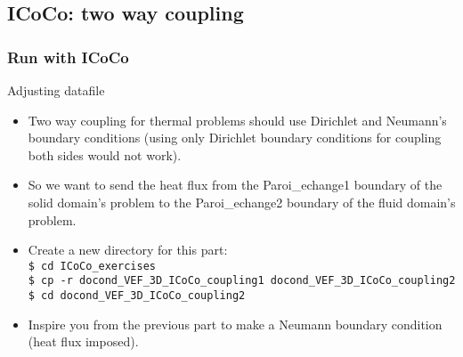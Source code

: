\documentclass[10pt, hyperref={unicode=true,pdfusetitle, bookmarks=true,bookmarksnumbered=false,bookmarksopen=false, breaklinks=false,pdfborder={0 0 1},backref=true,colorlinks=true,linkcolor=darkblue,pageanchor, urlcolor=darkblue}]{beamer}
\begin{document}
\subsection{{\bf{ICoCo: two way coupling}}}
\begin{frame}
\end{frame}
\begin{frame}
\frametitle{Run with ICoCo}

\begin{block}{Adjusting datafile}
\begin{itemize}
\item Two way coupling for thermal problems should use Dirichlet and Neumann's boundary conditions (using only Dirichlet boundary conditions for coupling both sides would not work).
\item So we want to send the heat flux from the Paroi\_echange1 boundary of the solid domain's problem to the Paroi\_echange2 boundary of the fluid domain's problem.
\item Create a new directory for this part:\\
\texttt{\$ cd ICoCo\_exercises}\\
\texttt{\$ cp -r docond\_VEF\_3D\_ICoCo\_coupling1 docond\_VEF\_3D\_ICoCo\_coupling2}\\
\texttt{\$ cd docond\_VEF\_3D\_ICoCo\_coupling2}\\
\item Inspire you from the previous part to make a Neumann boundary condition (heat flux imposed).

\end{itemize}
\end{block}

\end{frame}
\end{document}
